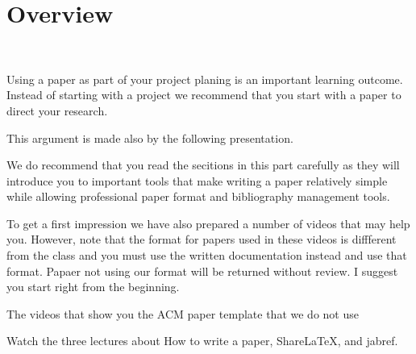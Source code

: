 \section{Overview}\label{C:overview-doc}

\FILENAME\

Using a paper as part of your project planing is an important learning
outcome. Instead of starting with a project we recommend that you
start with a paper to direct your research.

This argument is made also by the following presentation.


We do recommend that you read the secitions in this part carefully as they will introduce you to important tools that make writing a paper relatively simple while allowing professional paper format and bibliography management tools.

To get a first impression we have also prepared a number of videos that may help you. However, note that the format for papers used in these videos is diffferent from the class and you must use the written documentation instead and use that format. Papaer not using our format will be returned without review. I suggest you start right from the beginning.

\begin{WARNING}
The videos that show you the ACM paper template that we do not use



\end{WARNING}

\begin{exercise}\label{E:Documentation.1}
Watch the three lectures about How to write a paper, ShareLaTeX, and jabref.
\end{exercise}